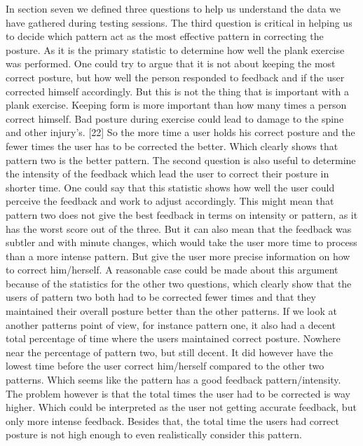 \documentclass[sigconf]{acmart}
\begin{document}
In section seven we defined three questions to help us understand the data we have gathered during testing sessions. The third question is critical in helping us to decide which pattern act as the most effective pattern in correcting the posture. As it is the primary statistic to determine how well the plank exercise was performed. One could try to argue that it is not about keeping the most correct posture, but how well the person responded to feedback and if the user corrected himself accordingly. But this is not the thing that is important with a plank exercise. Keeping form is more important than how many times a person correct himself. Bad posture during exercise could lead to damage to the spine and other injury's. [22] So the more time a user holds his correct posture and the fewer times the user has to be corrected the better. Which clearly shows that pattern two is the better pattern.
The second question is also useful to determine the intensity of the feedback which lead the user to correct their posture in shorter time. One could say that this statistic shows how well the user could perceive the feedback and work to adjust accordingly. This might mean that pattern two does not give the best feedback in terms on intensity or pattern, as it has the worst score out of the three. But it can also mean that the feedback was subtler and with minute changes, which would take the user more time to process than a more intense pattern. But give the user more precise information on how to correct him/herself. A reasonable case could be made about this argument because of the statistics for the other two questions, which clearly show that the users of pattern two both had to be corrected fewer times and that they maintained their overall posture better than the other patterns.
If we look at another patterns point of view, for instance pattern one, it also had a decent total percentage of time where the users maintained correct posture. Nowhere near the percentage of pattern two, but still decent. It did however have the lowest time before the user correct him/herself compared to the other two patterns. Which seems like the pattern has a good feedback pattern/intensity. The problem however is that the total times the user had to be corrected is way higher. Which could be interpreted as the user not getting accurate feedback, but only more intense feedback. Besides that, the total time the users had correct posture is not high enough to even realistically consider this pattern.
\end{document}
